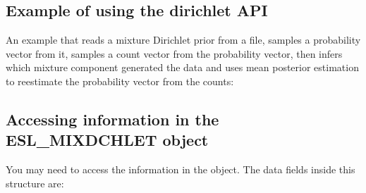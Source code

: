 \subsection{Example of using the dirichlet API}

An example that reads a mixture Dirichlet prior from a file, samples a
probability vector from it, samples a count vector from the
probability vector, then infers which mixture component generated the
data and uses mean posterior estimation to reestimate the probability
vector from the counts:



\subsection{Accessing information in the ESL\_MIXDCHLET object}

You may need to access the information in the 
object. The data fields inside this structure are:






